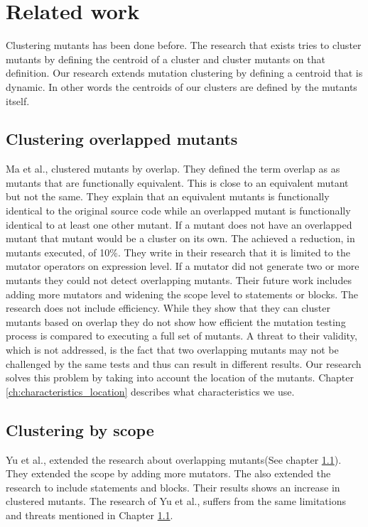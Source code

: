 \documentclass[../main]{subfiles}
\begin{document}
\chapter{Related work}
\label{ch:related_work}
Clustering mutants has been done before.
The research that exists tries to cluster mutants by defining the centroid of a cluster and cluster mutants on that definition.
Our research extends mutation clustering by defining a centroid that is dynamic.
In other words the centroids of our clusters are defined by the mutants itself.

\section{Clustering overlapped mutants}
\label{ch:overlapping_mutants}
Ma et al., clustered mutants by overlap\cite{Ma2016}.
They defined the term overlap as as mutants that are functionally equivalent.
This is close to an equivalent mutant but not the same.
They explain that an equivalent mutants is functionally identical to the original source code while an overlapped mutant is functionally identical to at least one other mutant.
If a mutant does not have an overlapped mutant that mutant would be a cluster on its own.
The achieved a reduction, in mutants executed, of 10\%.
They write in their research that it is limited to the mutator operators on expression level. 
If a mutator did not generate two or more mutants they could not detect overlapping mutants.
Their future work includes adding more mutators and widening the scope level to statements or blocks.
\newline
The research does not include efficiency.
While they show that they can cluster mutants based on overlap they do not show how efficient the mutation testing process is compared to executing a full set of mutants.
A threat to their validity, which is not addressed, is the fact that two overlapping mutants may not be challenged by the same tests and thus can result in different results.
Our research solves this problem by taking into account the location of the mutants.
Chapter \ref{ch:characteristics_location} describes what characteristics we use.

\section{Clustering by scope}
Yu et al., extended the research about overlapping mutants(See chapter \ref{ch:overlapping_mutants})\cite{Yu2019PossibilityScope}.
They extended the scope by adding more mutators.
The also extended the research to include statements and blocks.
Their results shows an increase in clustered mutants.
The research of Yu et al., suffers from the same limitations and threats  mentioned in Chapter \ref{ch:overlapping_mutants}.
\end{document}
